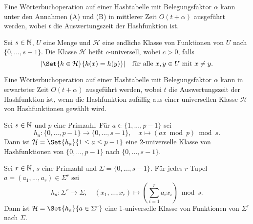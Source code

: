 \documentclass{cheat-sheet}
\begin{document}
\begin{satz}
  Eine Wörterbuchoperation auf einer Hashtabelle mit Belegungsfaktor $\alpha$ kann unter den Annahmen (A) und (B) in mittlerer Zeit $O(t + \alpha)$ ausgeführt werden, wobei $t$ die Auswertungszeit der Hashfunktion ist.
\end{satz}



\begin{defn}
  Sei $s \in \mathbb{N}$, $U$ eine Menge und $\mathcal{H}$ eine endliche Klasse von Funktionen von $U$ nach $\{ 0, ..., s-1 \}$. Die Klasse $\mathcal{H}$ heißt $c$-universell, wobei $c > 0$, falls
  \[
    \abs{\Set{h \in \mathcal{H}}{ h(x) = h(y) }} \quad \text{für alle $x, y \in U$ mit $x \not= y$.}
  \]
\end{defn}

\begin{satz}
  Eine Wörterbuchoperation auf einer Hashtabelle mit Belegungsfaktor $\alpha$ kann in erwarteter Zeit $O(t + \alpha)$ ausgeführt werden, wobei $t$ die Auswertungszeit der Hashfunktion ist, wenn die Hashfunktion zufällig aus einer universellen Klasse $\mathcal{H}$ von Hashfunktionen gewählt wird.
\end{satz}

\begin{lem}
  Sei $s \in \mathbb{N}$ und $p$ eine Primzahl. Für $a \in \{ 1, ..., p-1 \}$ sei
  \[
    h_a : \{ 0, ..., p{-}1 \} \to \{ 0, ..., s{-}1 \}, \quad
    x \mapsto (ax \bmod p) \bmod s.
  \]
  Dann ist $\mathcal{H} = \Set{h_a}{1 \leq a \leq p-1}$ eine 2-universelle Klasse von Hashfunktionen von $\{ 0, ..., p{-}1 \}$ nach $\{ 0, ..., s{-}1 \}$.
\end{lem}

\begin{lem}
  Sei $r \in \mathbb{N}$, $s$ eine Primzahl und $\Sigma = \{ 0, ..., s{-}1 \}$. Für jedes $r$-Tupel $a = (a_1, ..., a_r) \in \Sigma^r$ sei
  \[
    h_a : \Sigma^r \to \Sigma, \quad
    (x_1, ..., x_r) \mapsto \left( \sum_{i=1}^r a_i x_i \right) \bmod s.
  \]
  Dann ist $\mathcal{H} = \Set{h_a}{a \in \Sigma^r}$ eine 1-universelle Klasse von Funktionen von $\Sigma^r$ nach $\Sigma$.
\end{lem}



\end{document}
